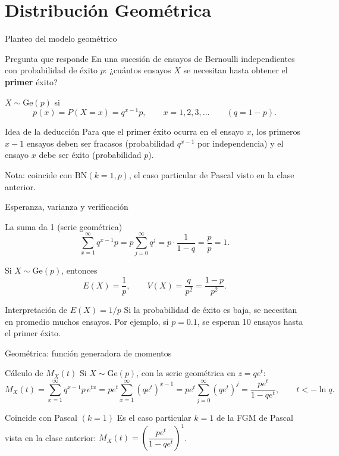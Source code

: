 \documentclass[aspectratio=169,11pt]{beamer}
\begin{document}
\section{Distribución Geométrica}

\begin{frame}{Planteo del modelo geométrico}
\begin{block}{Pregunta que responde}
En una sucesión de ensayos de Bernoulli independientes con probabilidad de éxito $p$: ¿cuántos ensayos $X$ se necesitan hasta obtener el \textbf{primer} éxito?
\end{block}

\begin{definition}
$X\sim\text{Ge}(p)$ si
$$p(x) = P(X=x) = q^{x-1}p, \qquad x=1,2,3,\dots \qquad (q=1-p).$$
\end{definition}

\begin{alertblock}{Idea de la deducción}
Para que el primer éxito ocurra en el ensayo $x$, los primeros $x-1$ ensayos deben ser fracasos (probabilidad $q^{x-1}$ por independencia) y el ensayo $x$ debe ser éxito (probabilidad $p$).
\end{alertblock}
Nota: coincide con $\text{BN}(k=1,p)$, el caso particular de Pascal visto en la clase anterior.
\end{frame}

\begin{frame}{Esperanza, varianza y verificación}
\begin{block}{La suma da 1 (serie geométrica)}
$$\sum_{x=1}^\infty q^{x-1}p = p\sum_{j=0}^\infty q^j = p\cdot\frac{1}{1-q} = \frac{p}{p}=1.$$
\end{block}

\begin{theorem}
Si $X\sim\text{Ge}(p)$, entonces
$$E(X) = \frac{1}{p}, \qquad V(X) = \frac{q}{p^2} = \frac{1-p}{p^2}.$$
\end{theorem}

\begin{block}{Interpretación de $E(X)=1/p$}
Si la probabilidad de éxito es baja, se necesitan en promedio muchos ensayos. Por ejemplo, si $p=0.1$, se esperan 10 ensayos hasta el primer éxito.
\end{block}
\end{frame}

\begin{frame}{Geométrica: función generadora de momentos}
\begin{block}{Cálculo de $M_X(t)$}
Si $X\sim\text{Ge}(p)$, con la serie geométrica en $z=qe^t$:
$$M_X(t) = \sum_{x=1}^\infty q^{x-1}p\,e^{tx} = pe^t\sum_{x=1}^\infty(qe^t)^{x-1} = pe^t\sum_{j=0}^\infty(qe^t)^j = \frac{pe^t}{1-qe^t}, \qquad t<-\ln q.$$
\end{block}

\begin{alertblock}{Coincide con Pascal $(k=1)$}
Es el caso particular $k=1$ de la FGM de Pascal vista en la clase anterior: $M_X(t)=\left(\dfrac{pe^t}{1-qe^t}\right)^1$.
\end{alertblock}
\end{frame}
\end{document}
